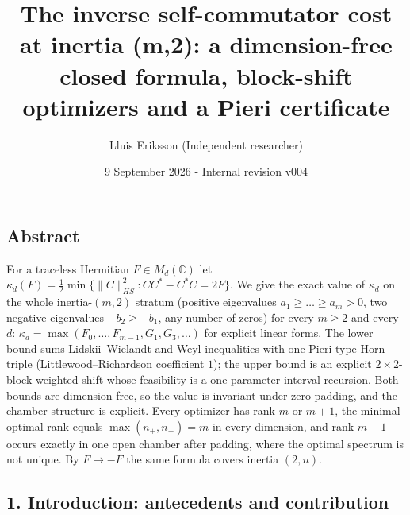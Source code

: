 \documentclass[
  11pt,
  a4paper,
]{article}
\title{The inverse self-commutator cost at inertia (m,2): a
dimension-free closed formula, block-shift optimizers and a Pieri
certificate}
\author{Lluis Eriksson (Independent researcher)}
\date{9 September 2026 - Internal revision v004}
\begin{document}
\maketitle

\subsection{Abstract}\label{abstract}

For a traceless Hermitian \(F\in M_d(\mathbb C)\) let
\(\kappa_d(F)=\tfrac12\min\{\|C\|_{HS}^2: CC^*-C^*C=2F\}\). We give the
exact value of \(\kappa_d\) on the whole inertia-\((m,\allowbreak{}2)\) stratum
(positive eigenvalues \(a_1\ge\dots\ge a_m>0\), two negative eigenvalues
\(-b_2\ge -b_1\), any number of zeros) for every \(m\ge2\) and every
\(d\): \(\kappa_d=\max(F_0,\allowbreak{}\dots,\allowbreak{}F_{m-1},\allowbreak{}G_1,\allowbreak{}G_3,\allowbreak{}\dots)\) for explicit
linear forms. The lower bound sums Lidskii--Wielandt and Weyl
inequalities with one Pieri-type Horn triple (Littlewood--Richardson
coefficient \(1\)); the upper bound is an explicit \(2\times2\)-block
weighted shift whose feasibility is a one-parameter interval recursion.
Both bounds are dimension-free, so the value is invariant under zero
padding, and the chamber structure is explicit. Every optimizer has rank
\(m\) or \(m+1\), the minimal optimal rank equals \(\max(n_+,\allowbreak{}n_-)=m\) in
every dimension, and rank \(m+1\) occurs exactly in one open chamber
after padding, where the optimal spectrum is not unique. By
\(F\mapsto-F\) the same formula covers inertia \((2,\allowbreak{}n)\).

\subsection{1. Introduction: antecedents and
contribution}\label{introduction-antecedents-and-contribution}
\end{document}

